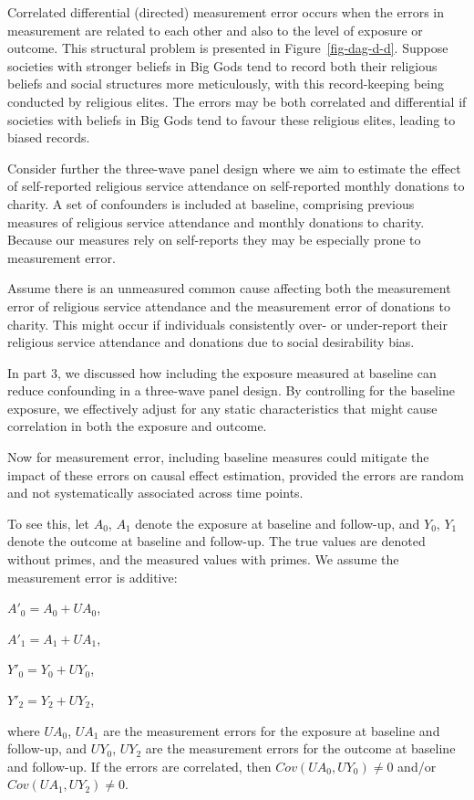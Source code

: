 \documentclass[
  singlecolumn]{report}
\begin{document}
Correlated differential (directed) measurement error occurs when the
errors in measurement are related to each other and also to the level of
exposure or outcome. This structural problem is presented in
Figure~\ref{fig-dag-d-d}. Suppose societies with stronger beliefs in Big
Gods tend to record both their religious beliefs and social structures
more meticulously, with this record-keeping being conducted by religious
elites. The errors may be both correlated and differential if societies
with beliefs in Big Gods tend to favour these religious elites, leading
to biased records.

Consider further the three-wave panel design where we aim to estimate
the effect of self-reported religious service attendance on
self-reported monthly donations to charity. A set of confounders is
included at baseline, comprising previous measures of religious service
attendance and monthly donations to charity. Because our measures rely
on self-reports they may be especially prone to measurement error.

Assume there is an unmeasured common cause affecting both the
measurement error of religious service attendance and the measurement
error of donations to charity. This might occur if individuals
consistently over- or under-report their religious service attendance
and donations due to social desirability bias.

In part 3, we discussed how including the exposure measured at baseline
can reduce confounding in a three-wave panel design. By controlling for
the baseline exposure, we effectively adjust for any static
characteristics that might cause correlation in both the exposure and
outcome.

Now for measurement error, including baseline measures could mitigate
the impact of these errors on causal effect estimation, provided the
errors are random and not systematically associated across time points.

To see this, let \(A_0\), \(A_1\) denote the exposure at baseline and
follow-up, and \(Y_0\), \(Y_1\) denote the outcome at baseline and
follow-up. The true values are denoted without primes, and the measured
values with primes. We assume the measurement error is additive:

\(A'_0 = A_0 + UA_0\),

\(A'_1 = A_1 + UA_1\),

\(Y'_0 = Y_0 + UY_0\),

\(Y'_2 = Y_2 + UY_2\),

where \(UA_0\), \(UA_1\) are the measurement errors for the exposure at
baseline and follow-up, and \(UY_0\), \(UY_2\) are the measurement
errors for the outcome at baseline and follow-up. If the errors are
correlated, then \(Cov(UA_0, UY_0) \neq 0\) and/or
\(Cov(UA_1, UY_2) \neq 0\).
\end{document}
